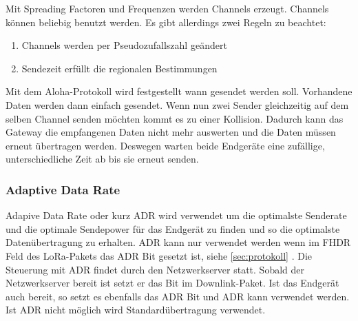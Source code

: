 \documentclass[a4paper, 12pt]{article}
\begin{document}
            Mit Spreading Factoren und Frequenzen werden Channels erzeugt. Channels können 
            beliebig benutzt werden. Es gibt allerdings zwei Regeln zu beachtet: 
            \begin{enumerate}   
                \item Channels werden per Pseudozufallszahl geändert
                \item Sendezeit erfüllt die regionalen Bestimmungen
            \end{enumerate}
            
            Mit dem Aloha-Protokoll wird festgestellt wann gesendet werden soll. Vorhandene Daten werden dann einfach 
            gesendet. Wenn nun zwei Sender gleichzeitig auf dem selben Channel senden 
            möchten kommt es zu einer Kollision. Dadurch kann das Gateway die empfangenen Daten nicht mehr auswerten 
            und die Daten müssen erneut übertragen werden. Deswegen warten beide Endgeräte eine zufällige, 
            unterschiedliche Zeit ab bis sie erneut senden.

            \subsubsection{Adaptive Data Rate}\label{sec:ADR}
                Adapive Data Rate oder kurz ADR wird verwendet um die optimalste Senderate und die optimale 
                Sendepower für das Endgerät zu finden und so die optimalste Datenübertragung zu erhalten. ADR kann nur 
                verwendet werden wenn im FHDR Feld des LoRa-Pakets das ADR Bit gesetzt ist, siehe 
                \ref{sec:protokoll} . Die Steuerung mit ADR findet durch den Netzwerkserver statt. Sobald der 
                Netzwerkserver bereit ist setzt er das Bit im Downlink-Paket. Ist das Endgerät auch bereit, so 
                setzt es ebenfalls das ADR Bit und ADR kann verwendet werden. Ist ADR nicht möglich wird Standardübertragung 
                verwendet.
\end{document}
